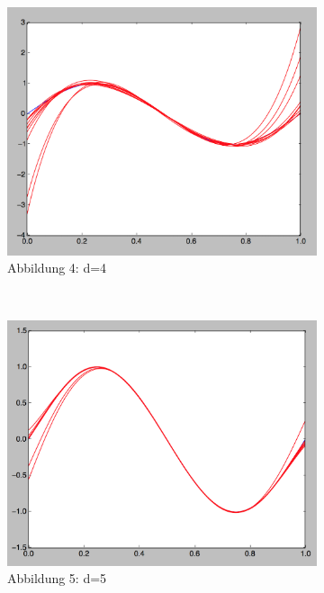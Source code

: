 \documentclass[a4paper,11pt,twoside]{article}
\begin{document}
\begin{figure}[h]
	\captionsetup[subfigure]{labelformat=empty}
	\centering
	\begin{subfigure}[t]{0.33\textwidth}
		\includegraphics[width=\textwidth]{images/Nr_1/d_4.png}
		\caption{Abbildung 4: d=4}
	\end{subfigure}%
	~
	\begin{subfigure}[t]{0.33\textwidth}
		\includegraphics[width=\textwidth]{images/Nr_1/d_5.png}
		\caption{Abbildung 5: d=5}
	\end{subfigure}%
	~
	\begin{subfigure}[t]{0.33\textwidth}

\end{subfigure}
\end{figure}
\end{document}
